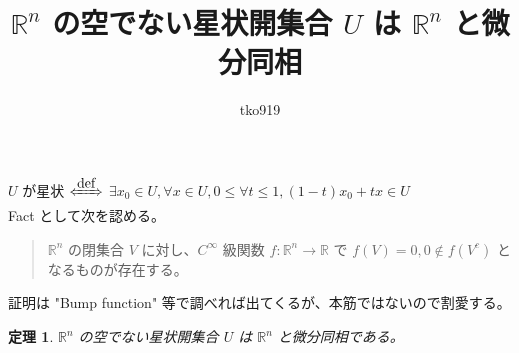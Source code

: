 \documentclass[a4paper,10pt]{jsarticle}
\newtheorem{thm}{定理}[section]
\begin{document}
\title{$\mathbb{R}^n$ の空でない星状開集合 $U$ は $\mathbb{R}^n$ と微分同相}
\author{tko919}
\date{}
\maketitle

$U$ が星状 $\xLeftrightarrow{\mbox{def}}$ $\exists x_0 \in U,\forall x \in U,0 \leq \forall t \leq 1,(1-t)x_0+tx \in U$ \\

Fact として次を認める。
\begin{quote}
  $\mathbb{R}^n$ の閉集合 $V$ に対し、$C^\infty$ 級関数 $f:\mathbb{R}^n\to \mathbb{R}$ で $f(V)=0,0 \notin f(V^c)$ となるものが存在する。
\end{quote}
証明は "Bump function" 等で調べれば出てくるが、本筋ではないので割愛する。 \\

\begin{thm}
  $\mathbb{R}^n$ の空でない星状開集合 $U$ は $\mathbb{R}^n$ と微分同相である。
\end{thm}
\end{document}
